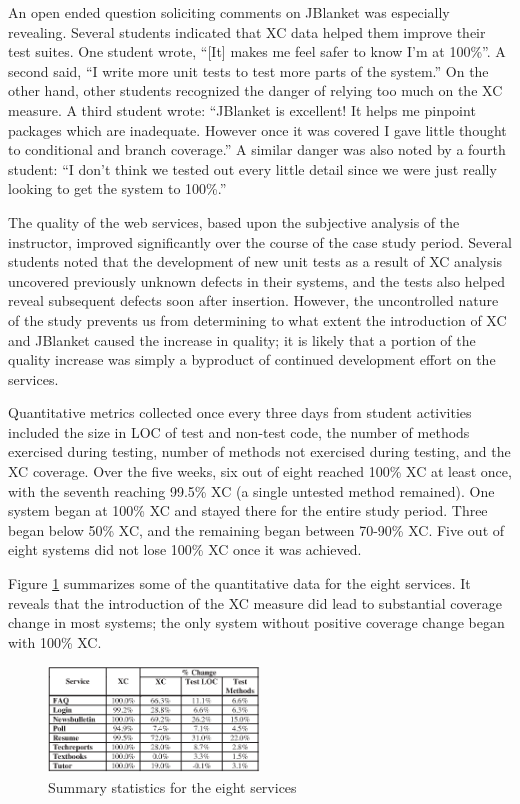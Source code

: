 \documentclass[10pt,twocolumn]{article}
\begin{document}
An open ended question soliciting comments on JBlanket was especially
revealing. Several students indicated that XC data helped them improve
their test suites.  One student wrote, ``[It] makes me feel safer to know
I'm at 100\%''. A second said, ``I write more unit tests to test more parts
of the system.''  On the other hand, other students recognized the danger
of relying too much on the XC measure. A third student wrote: ``JBlanket is
excellent!  It helps me pinpoint packages which are inadequate. However
once it was covered I gave little thought to conditional and branch
coverage.'' A similar danger was also noted by a fourth student: ``I don't
think we tested out every little detail since we were just really looking
to get the system to 100\%.''

The quality of the web services, based upon the subjective analysis of the
instructor, improved significantly over the course of the case study
period. Several students noted that the development of new unit tests as
a result of XC analysis uncovered previously unknown defects in their
systems, and the tests also helped reveal subsequent defects soon after
insertion. However, the uncontrolled nature of the study prevents us from
determining to what extent the introduction of XC and JBlanket caused the
increase in quality; it is likely that a portion of the quality increase
was simply a byproduct of continued development effort on the services.

Quantitative metrics collected once every three days from student
activities included the size in LOC of test and non-test code, the number
of methods exercised during testing, number of methods not exercised during
testing, and the XC coverage.  Over the five weeks, six out of eight
reached 100\% XC at least once, with the seventh reaching 99.5\% XC (a
single untested method remained).  One system began at 100\% XC and stayed
there for the entire study period. Three began below 50\% XC, and the
remaining began between 70-90\% XC.  Five out of eight systems did not lose
100\% XC once it was achieved. 

Figure \ref{table:crest.results.change}
summarizes some of the quantitative data for the eight services. It reveals
that the introduction of the XC measure did lead to substantial coverage
change in most systems; the only system without positive coverage change 
began with 100\% XC.

\begin{figure}[htbp]
  \begin{center}
    \includegraphics[width=0.50\textwidth]{figs/table.crest.results.change3.eps}
    \caption{Summary statistics for the eight services}
    \label{table:crest.results.change}
  \end{center}
\end{figure}
\end{document}
